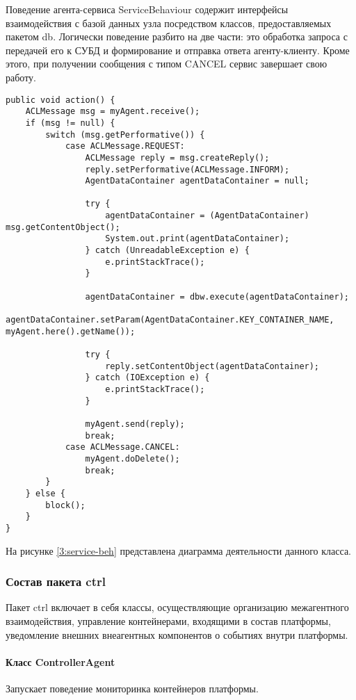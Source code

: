 Поведение агента-сервиса ServiceBehaviour содержит интерфейсы взаимодействия с базой данных узла посредством классов, предоставляемых пакетом db. Логически поведение разбито на две части: это обработка запроса с передачей его к СУБД и формирование и отправка ответа агенту-клиенту. Кроме этого, при получении сообщения с типом CANCEL сервис завершает свою работу.
\begin{verbatim}
public void action() {
    ACLMessage msg = myAgent.receive();
    if (msg != null) {
        switch (msg.getPerformative()) {
            case ACLMessage.REQUEST:
                ACLMessage reply = msg.createReply();
                reply.setPerformative(ACLMessage.INFORM);
                AgentDataContainer agentDataContainer = null;

                try {
                    agentDataContainer = (AgentDataContainer) msg.getContentObject();
                    System.out.print(agentDataContainer);
                } catch (UnreadableException e) {
                    e.printStackTrace();
                }

                agentDataContainer = dbw.execute(agentDataContainer);
                agentDataContainer.setParam(AgentDataContainer.KEY_CONTAINER_NAME, myAgent.here().getName());

                try {
                    reply.setContentObject(agentDataContainer);
                } catch (IOException e) {
                    e.printStackTrace();
                }

                myAgent.send(reply);
                break;
            case ACLMessage.CANCEL:
                myAgent.doDelete();
                break;
        }
    } else {
        block();
    }
}
\end{verbatim}
На рисунке \ref{3:service-beh} представлена диаграмма деятельности данного класса.

\subsubsection{Состав пакета ctrl}
Пакет ctrl включает в себя классы, осуществляющие организацию межагентного взаимодействия, управление контейнерами, входящими в состав платформы, уведомление внешних внеагентных компонентов о событиях внутри платформы.
\paragraph{Класс ControllerAgent}
Запускает поведение мониторинка контейнеров платформы.

